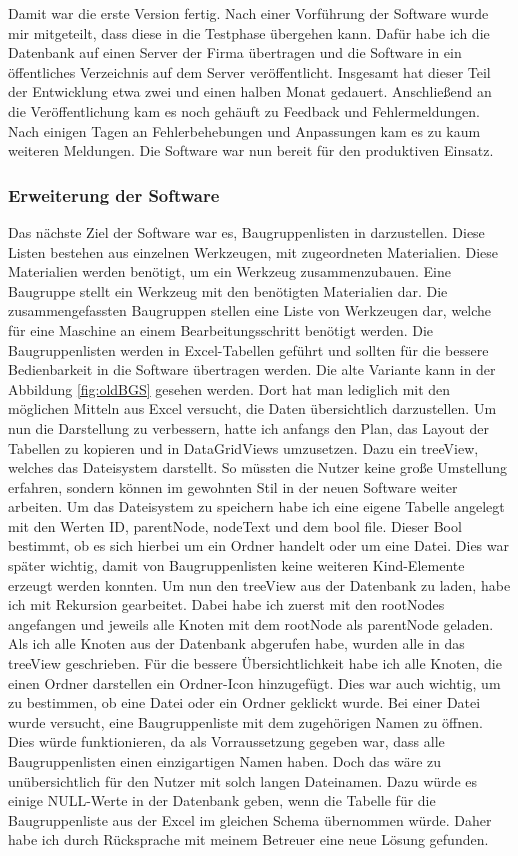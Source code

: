 \documentclass{Vorlage}
\begin{document}
Damit war die erste Version fertig. Nach einer Vorführung der Software wurde mir mitgeteilt, dass diese
in die Testphase übergehen kann. Dafür habe ich die Datenbank auf einen Server der Firma übertragen und
die Software in ein öffentliches Verzeichnis auf dem Server veröffentlicht. Insgesamt hat dieser Teil der 
Entwicklung etwa zwei und einen halben Monat gedauert. Anschließend an die Veröffentlichung kam es noch gehäuft
zu Feedback und Fehlermeldungen. Nach einigen Tagen an Fehlerbehebungen und Anpassungen kam es zu kaum 
weiteren Meldungen. Die Software war nun bereit für den produktiven Einsatz.
\subsubsection{Erweiterung der Software}

Das nächste Ziel der Software war es, Baugruppenlisten in darzustellen. 
Diese Listen bestehen aus einzelnen Werkzeugen, mit zugeordneten Materialien. Diese Materialien
werden benötigt, um ein Werkzeug zusammenzubauen. Eine Baugruppe stellt ein Werkzeug mit den benötigten 
Materialien dar. Die zusammengefassten Baugruppen stellen eine Liste von Werkzeugen dar, welche für eine
Maschine an einem Bearbeitungsschritt benötigt werden.
Die Baugruppenlisten werden in Excel-Tabellen geführt und sollten für die bessere 
Bedienbarkeit in die Software übertragen werden. Die alte Variante kann in der Abbildung \ref{fig:oldBGS}
gesehen werden. Dort hat man lediglich mit den möglichen Mitteln aus Excel versucht, die Daten übersichtlich
darzustellen.
Um nun die Darstellung zu verbessern, hatte ich anfangs den Plan, das Layout der Tabellen zu kopieren
und in DataGridViews umzusetzen. Dazu ein treeView, welches das Dateisystem darstellt. So müssten die Nutzer 
keine große Umstellung erfahren, sondern können im gewohnten Stil in der neuen Software weiter arbeiten. 
Um das Dateisystem zu speichern habe ich eine eigene Tabelle angelegt mit den Werten ID, parentNode, 
nodeText und dem bool \glqq file\grqq. Dieser Bool bestimmt, ob es sich hierbei um ein Ordner handelt oder 
um eine Datei. Dies war später wichtig, damit von Baugruppenlisten	keine weiteren Kind-Elemente erzeugt werden 
konnten. Um nun den treeView aus der Datenbank zu laden, habe ich mit Rekursion gearbeitet. Dabei habe ich 
zuerst mit den rootNodes angefangen und jeweils alle Knoten mit dem rootNode als parentNode geladen. Als ich 
alle Knoten aus der Datenbank abgerufen habe, wurden alle in das treeView geschrieben. Für die bessere 
Übersichtlichkeit habe ich alle Knoten, die einen Ordner darstellen ein Ordner-Icon hinzugefügt. 
Dies war auch wichtig, um zu bestimmen, ob eine Datei oder ein Ordner geklickt wurde. Bei einer Datei 
wurde versucht, eine Baugruppenliste mit dem zugehörigen Namen zu öffnen. Dies würde funktionieren, 
da als Vorraussetzung gegeben war, dass alle Baugruppenlisten einen einzigartigen Namen haben. Doch das 
wäre zu unübersichtlich für den Nutzer mit solch langen Dateinamen.
Dazu würde es einige NULL-Werte in der Datenbank geben, wenn die Tabelle für die Baugruppenliste aus der 
Excel im gleichen Schema übernommen würde. Daher habe ich durch Rücksprache mit meinem Betreuer eine 
neue Lösung gefunden.
\end{document}
